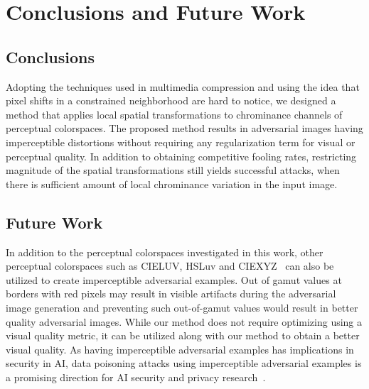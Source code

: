 \chapter{Conclusions and Future Work}
\label{chp:6_conclusion}
\section{Conclusions}
Adopting the techniques used in multimedia compression and using the idea that pixel shifts in a constrained neighborhood are hard to notice, we designed a method that applies local spatial transformations to chrominance channels of perceptual colorspaces. The proposed method results in adversarial images having imperceptible distortions without requiring any regularization term for visual or perceptual quality. In addition to obtaining competitive fooling rates, restricting magnitude of the spatial transformations still yields successful attacks, when there is sufficient amount of local chrominance variation in the input image.

\section{Future Work}
In addition to the perceptual colorspaces investigated in this work, other perceptual colorspaces such as CIELUV, HSLuv and CIEXYZ~\cite{schanda2007colorimetry} can also be utilized to create imperceptible adversarial examples. Out of gamut values at borders with red pixels may result in visible artifacts during the adversarial image generation and preventing such out-of-gamut values would result in better quality adversarial images. While our method does not require optimizing using a visual quality metric, it can be utilized along with our method to obtain a better visual quality.
As having imperceptible adversarial examples has implications in security in AI, data poisoning attacks using imperceptible adversarial examples is a promising direction for AI security and privacy research~\cite{carlini2017towards,ilyas2019adversarial}. 
